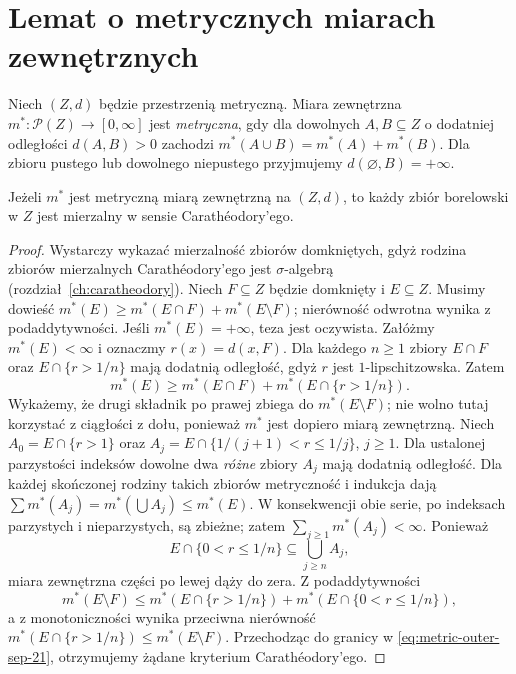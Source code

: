 \section{Lemat o metrycznych miarach zewnętrznych}
\begin{definicja}
\label{def:metric-outer-21}
Niech $(Z,d)$ będzie przestrzenią metryczną.
Miara zewnętrzna $m^*:\mathcal P(Z)\to[0,\infty]$
jest \emph{metryczna}, gdy dla dowolnych $A,B\subseteq Z$
o dodatniej odległości $d(A,B)>0$ zachodzi
$m^*(A\cup B)=m^*(A)+m^*(B)$.
Dla zbioru pustego lub dowolnego niepustego przyjmujemy
$d(\varnothing,B)=+\infty$.
\end{definicja}

\begin{lemat}
\label{lem:metric-outer-borel-21}
Jeżeli $m^*$ jest metryczną miarą zewnętrzną na $(Z,d)$,
to każdy zbiór borelowski w $Z$ jest mierzalny w sensie
Carathéodory'ego.
\end{lemat}
\begin{proof}
Wystarczy wykazać mierzalność zbiorów domkniętych, gdyż
rodzina zbiorów mierzalnych Carathéodory'ego jest
$\sigma$-algebrą (rozdział~\ref{ch:caratheodory}).
Niech $F\subseteq Z$ będzie domknięty i $E\subseteq Z$.
Musimy dowieść
$m^*(E)\ge m^*(E\cap F)+m^*(E\setminus F)$;
nierówność odwrotna wynika z podaddytywności.
Jeśli $m^*(E)=+\infty$, teza jest oczywista. Załóżmy
$m^*(E)<\infty$ i oznaczmy $r(x)=d(x,F)$.
Dla każdego $n\ge1$ zbiory $E\cap F$ oraz
$E\cap\{r>1/n\}$ mają dodatnią odległość, gdyż
$r$ jest $1$-lipschitzowska. Zatem
\begin{equation}\label{eq:metric-outer-sep-21}
 m^*(E)\ge m^*(E\cap F)+m^*(E\cap\{r>1/n\}).
\end{equation}
Wykażemy, że drugi składnik po prawej zbiega do
$m^*(E\setminus F)$; nie wolno tutaj korzystać z ciągłości
z dołu, ponieważ $m^*$ jest dopiero miarą zewnętrzną.
Niech $A_0=E\cap\{r>1\}$ oraz
$A_j=E\cap\{1/(j+1)<r\le1/j\}$, $j\ge1$.
Dla ustalonej parzystości indeksów dowolne dwa
\emph{różne} zbiory $A_j$ mają dodatnią odległość.
Dla każdej skończonej rodziny takich zbiorów metryczność
i indukcja dają
$\sum m^*(A_j)=m^*(\bigcup A_j)\le m^*(E)$.
W konsekwencji obie serie, po indeksach parzystych
i nieparzystych, są zbieżne; zatem
$\sum_{j\ge1}m^*(A_j)<\infty$. Ponieważ
\[
 E\cap\{0<r\le1/n\}\subseteq\bigcup_{j\ge n}A_j,
\]
miara zewnętrzna części po lewej dąży do zera.
Z podaddytywności
\[
 m^*(E\setminus F)\le
 m^*(E\cap\{r>1/n\})+
 m^*(E\cap\{0<r\le1/n\}),
\]
a z monotoniczności wynika przeciwna nierówność
$m^*(E\cap\{r>1/n\})\le m^*(E\setminus F)$.
Przechodząc do granicy w \eqref{eq:metric-outer-sep-21},
otrzymujemy żądane kryterium Carathéodory'ego.
\end{proof}

